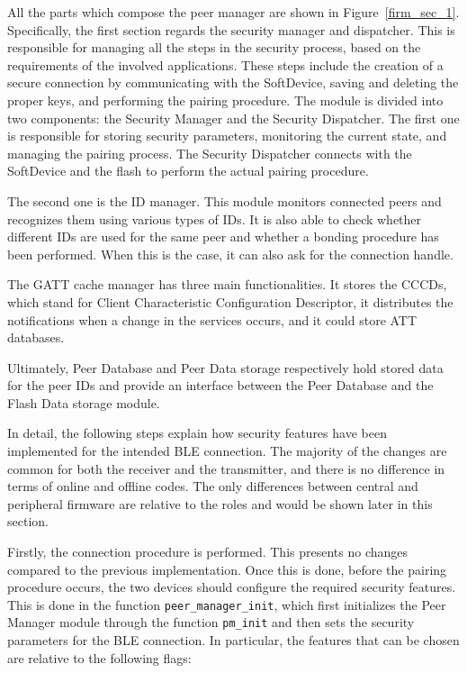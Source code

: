 \documentclass{Configuration_Files/PoliMi3i_thesis}
\begin{document}
All the parts which compose the peer manager are shown in Figure~\ref{firm_sec_1}. Specifically, the first section regards the security manager and dispatcher. This is responsible for managing all the steps in the security process, based on the requirements of the involved applications. These steps include the creation of a secure connection by communicating with the SoftDevice, saving and deleting the proper keys, and performing the pairing procedure. The module is divided into two components: the Security Manager and the Security Dispatcher. The first one is responsible for storing security parameters, monitoring the current state, and managing the pairing process. The Security Dispatcher connects with the SoftDevice and the flash to perform the actual pairing procedure.

The second one is the ID manager. This module monitors connected peers and recognizes them using various types of IDs. It is also able to check whether different IDs are used for the same peer and whether a bonding procedure has been performed. When this is the case, it can also ask for the connection handle.

The GATT cache manager has three main functionalities. It stores the CCCDs, which stand for Client Characteristic Configuration Descriptor, it distributes the notifications when a change in the services occurs, and it could store ATT databases.

Ultimately, Peer Database and Peer Data storage respectively hold stored data for the peer IDs and provide an interface between the Peer Database and the Flash Data storage module.

In detail, the following steps explain how security features have been implemented for the intended BLE connection. The majority of the changes are common for both the receiver and the transmitter, and there is no difference in terms of online and offline codes. The only differences between central and peripheral firmware are relative to the roles and would be shown later in this section.

Firstly, the connection procedure is performed. This presents no changes compared to the previous implementation. Once this is done, before the pairing procedure occurs, the two devices should configure the required security features. This is done in the function \texttt{peer\_manager\_init}, which first initializes the Peer Manager module through the function \texttt{pm\_init} and then sets the security parameters for the BLE connection. In particular, the features that can be chosen are relative to the following flags:
\end{document}
